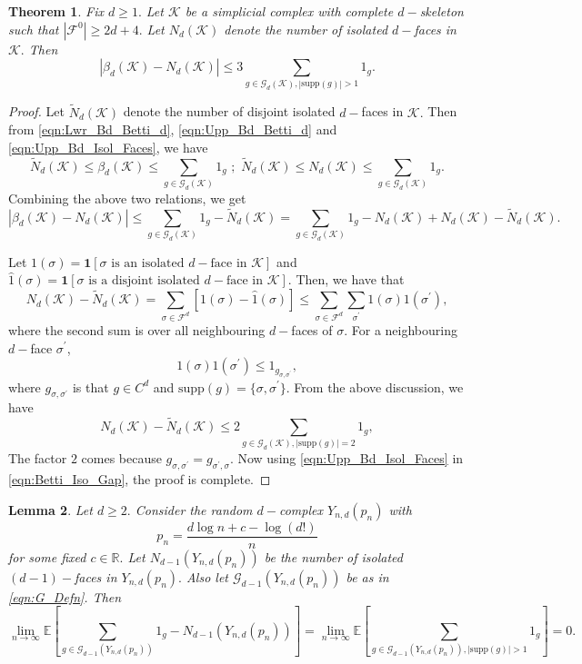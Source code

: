 \documentclass[12pt]{amsart}
\newtheorem{theorem}{Theorem}[section]
\newtheorem{lemma}[theorem]{Lemma}
\numberwithin{equation}{section}
\numberwithin{theorem}{section}
\newcommand{\1}{\mathbf{1}}
\def\F{\mathcal{F}}
\def\K{\mathcal{K}}
\def\G{\mathcal{G}}
\def\bR{\mathbb{R}}
\def\supp{\mathrm{supp}}
\begin{document}
\begin{theorem}
\label{thm:Betti_Iso_Bd}
Fix $d \geq 1.$ Let $\K$ be a simplicial complex with complete $d-$skeleton such that $|\F^0| \geq 2d + 4.$ Let $N_{d}(\K)$ denote the number of isolated $d -$faces in $\K.$ Then
\[
|\beta_d(\K) - N_d(\K)| \leq 3\sum_{g \in \G_{d}(\K), |\supp(g)| > 1}1_g.
\]
\end{theorem}
\begin{proof}
Let $\tilde{N}_{d}(\K)$ denote the number of disjoint isolated $d-$faces in $\K.$ Then from \eqref{eqn:Lwr_Bd_Betti_d}, \eqref{eqn:Upp_Bd_Betti_d} and \eqref{eqn:Upp_Bd_Isol_Faces}, we have
\[
\tilde{N}_{d}(\K) \leq \beta_{d}(\K) \leq \sum_{g \in \G_{d}(\K)}1_g \, \, ;  \, \,
\tilde{N}_{d}(\K) \leq N_d(\K) \leq \sum_{g \in \G_{d}(\K)}1_g. \]
%
%
Combining the above two relations, we get
\begin{equation}
\label{eqn:Betti_Iso_Gap}
|\beta_d(\K) - N_d(\K)| \leq \sum_{g \in \G_{d}(\K)}1_g - \tilde{N}_d(\K) = \sum_{g \in \G_{d}(\K)}1_g - N_d(\K) + N_d(\K) -  \tilde{N}_d(\K).
\end{equation}

Let $1(\sigma) = \1[\mbox{$\sigma$ is an isolated $d-$face in $\K$}]$ and $\hat{1}(\sigma) = \1[\mbox{$\sigma$ is a disjoint isolated $d-$face in $\K$}].$ Then, we have that
%
\[
N_d(\K) - \tilde{N}_d(\K) = \sum_{\sigma \in \F^d} [1(\sigma) - \hat{1}(\sigma)] \leq \sum_{\sigma \in \F^d}\sum_{\sigma^\prime} 1(\sigma) 1(\sigma^\prime),
\]
%
where the second sum is over all neighbouring $d-$faces of $\sigma$. For a neighbouring $d-$face $\sigma^\prime$,
\[
1(\sigma) 1(\sigma^\prime)  \leq 1_{g_{\sigma, \sigma^\prime}} ,
\]
where $g_{\sigma, \sigma^\prime}$ is that $g \in C^d$ and $\supp(g) = \{\sigma, \sigma^\prime\}.$ From the above discussion, we have
\[
N_d(\K) - \tilde{N}_d(\K) \leq 2 \sum_{g \in \G_d(\K), |\supp(g)| =2} 1_{g},
\]
The factor $2$ comes because $g_{\sigma, \sigma^\prime} = g_{\sigma^\prime, \sigma}.$ Now using  \eqref{eqn:Upp_Bd_Isol_Faces} in \eqref{eqn:Betti_Iso_Gap}, the proof is complete.
\end{proof}
%		

\begin{lemma}
\cite[(3.5), (5.1)]{kahle2014inside}
\label{lem:NoLargeCochains}
Let $d \geq 2.$ Consider the random $d-$complex $Y_{n, d}(p_n)$ with
\[
p_n = \frac{d \log n + c - \log(d!) }{n}
\]
for some fixed $c \in \bR.$ Let $N_{d - 1}(Y_{n, d}(p_n))$ be the number of isolated $(d - 1)-$faces in $Y_{n, d}(p_n).$ Also let $\G_{d - 1}(Y_{n, d}(p_n))$ be as in \eqref{eqn:G_Defn}. Then
\[
\lim_{n \to \infty} \mathbb{E}\left[\sum_{g \in \G_{d - 1}(Y_{n, d}(p_n))} 1_g  - N_{d - 1}(Y_{n, d}(p_n))\right] = \lim_{n \to \infty} \mathbb{E}\left[\sum_{g \in \G_{d - 1}(Y_{n, d}(p_n)), |\supp(g)| > 1} 1_g\right] =  0.
\]
\end{lemma}
\end{document}
